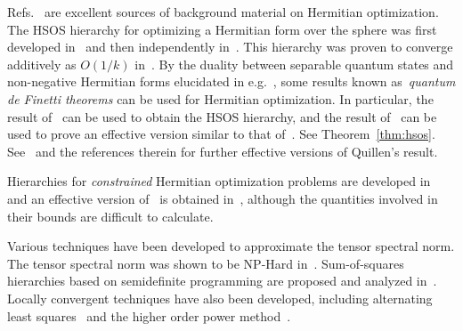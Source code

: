 \documentclass[11pt]{article}
\numberwithin{theorem}{section}
\theoremstyle{definition}
\newcommand{\setft}[1]{\mathrm{#1}}
\newcommand{\Herm}{\setft{Herm}}
\newcommand{\complex}{\mathbb{C}}
\newcommand{\real}{\mathbb{R}}
\begin{document}
Refs.~\cite{d2011hermitian, d2019hermitian} are excellent sources of background material on Hermitian optimization. The HSOS hierarchy for optimizing a Hermitian form over the sphere was first developed in~\cite{quillen1968representation} and then independently in~\cite{catlin1995stabilization}. This hierarchy was proven to converge additively as $O(1/k)$ in~\cite{to2006effective}. By the duality between separable quantum states and non-negative Hermitian forms elucidated in e.g.~\cite{fang2021sum,muller2023refinement}, some results known as~\textit{quantum de Finetti theorems} can be used for Hermitian optimization. In particular, the result of~\cite{hudson1976locally} can be used to obtain the HSOS hierarchy, and the result of~\cite{christandl2007one} can be used to prove an effective version similar to that of~\cite{to2006effective}. See Theorem~\ref{thm:hsos}. See~\cite{drouot2013quantitative} and the references therein for further effective versions of Quillen's result.


Hierarchies for \textit{constrained} Hermitian optimization problems are developed in~\cite{catlin1999isometric,d2009polynomial,DJLV24} and an effective version of~\cite{catlin1999isometric} is obtained in~\cite{tan2021effective}, although the quantities involved in their bounds are difficult to calculate. %


Various techniques have been developed to approximate the tensor spectral norm. The tensor spectral norm was shown to be NP-Hard in~\cite{HL}. Sum-of-squares hierarchies based on semidefinite programming are proposed and analyzed in~\cite{nie2014semidefinite,harrow2017improved,fang2021sum}. Locally convergent techniques have also been developed, including alternating least squares~\cite{de2000best,FMPS13} and the higher order power method~\cite{de1995higher}.


\end{document}
